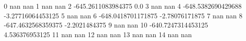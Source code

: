 0 nan nan
1 nan nan
2 -645.2611083984375 0.0
3 nan nan
4 -648.5382690429688 -3.27716064453125
5 nan nan
6 -648.0418701171875 -2.78076171875
7 nan nan
8 -647.4632568359375 -2.2021484375
9 nan nan
10 -640.7247314453125 4.536376953125
11 nan nan
12 nan nan
13 nan nan
14 nan nan
